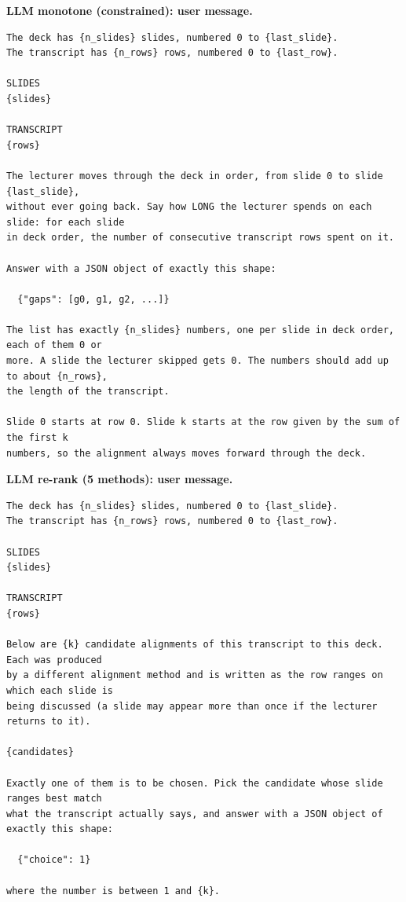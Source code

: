 \par\medskip\noindent\textbf{LLM monotone (constrained): user message.}\par\nobreak
\begin{lstlisting}
The deck has {n_slides} slides, numbered 0 to {last_slide}.
The transcript has {n_rows} rows, numbered 0 to {last_row}.

SLIDES
{slides}

TRANSCRIPT
{rows}

The lecturer moves through the deck in order, from slide 0 to slide {last_slide},
without ever going back. Say how LONG the lecturer spends on each slide: for each slide
in deck order, the number of consecutive transcript rows spent on it.

Answer with a JSON object of exactly this shape:

  {"gaps": [g0, g1, g2, ...]}

The list has exactly {n_slides} numbers, one per slide in deck order, each of them 0 or
more. A slide the lecturer skipped gets 0. The numbers should add up to about {n_rows},
the length of the transcript.

Slide 0 starts at row 0. Slide k starts at the row given by the sum of the first k
numbers, so the alignment always moves forward through the deck.
\end{lstlisting}

\par\medskip\noindent\textbf{LLM re-rank (5 methods): user message.}\par\nobreak
\begin{lstlisting}
The deck has {n_slides} slides, numbered 0 to {last_slide}.
The transcript has {n_rows} rows, numbered 0 to {last_row}.

SLIDES
{slides}

TRANSCRIPT
{rows}

Below are {k} candidate alignments of this transcript to this deck. Each was produced
by a different alignment method and is written as the row ranges on which each slide is
being discussed (a slide may appear more than once if the lecturer returns to it).

{candidates}

Exactly one of them is to be chosen. Pick the candidate whose slide ranges best match
what the transcript actually says, and answer with a JSON object of exactly this shape:

  {"choice": 1}

where the number is between 1 and {k}.
\end{lstlisting}

